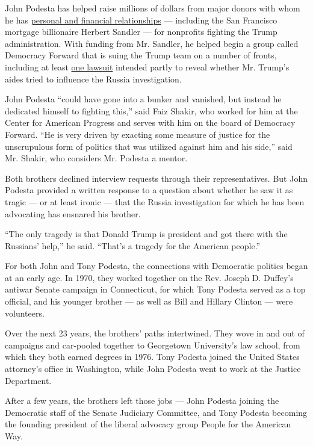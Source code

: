 John Podesta has helped raise millions of dollars from major donors with
whom he has
\href{https://www.politico.com/story/2016/11/john-podesta-donor-foundation-230571}{personal
and financial relationships} --- including the San Francisco mortgage
billionaire Herbert Sandler --- for nonprofits fighting the Trump
administration. With funding from Mr. Sandler, he helped begin a group
called Democracy Forward that is suing the Trump team on a number of
fronts, including at least
\href{https://democracyforward.org/wp-content/uploads/2017/09/DOJ-FOIA-Complaint.pdf}{one
lawsuit} intended partly to reveal whether Mr. Trump's aides tried to
influence the Russia investigation.

John Podesta ``could have gone into a bunker and vanished, but instead
he dedicated himself to fighting this,'' said Faiz Shakir, who worked
for him at the Center for American Progress and serves with him on the
board of Democracy Forward. ``He is very driven by exacting some measure
of justice for the unscrupulous form of politics that was utilized
against him and his side,'' said Mr. Shakir, who considers Mr. Podesta a
mentor.

Both brothers declined interview requests through their representatives.
But John Podesta provided a written response to a question about whether
he saw it as tragic --- or at least ironic --- that the Russia
investigation for which he has been advocating has ensnared his brother.

``The only tragedy is that Donald Trump is president and got there with
the Russians' help,'' he said. ``That's a tragedy for the American
people.''

For both John and Tony Podesta, the connections with Democratic politics
began at an early age. In 1970, they worked together on the Rev. Joseph
D. Duffey's antiwar Senate campaign in Connecticut, for which Tony
Podesta served as a top official, and his younger brother --- as well as
Bill and Hillary Clinton --- were volunteers.

Over the next 23 years, the brothers' paths intertwined. They wove in
and out of campaigns and car-pooled together to Georgetown University's
law school, from which they both earned degrees in 1976. Tony Podesta
joined the United States attorney's office in Washington, while John
Podesta went to work at the Justice Department.

After a few years, the brothers left those jobs --- John Podesta joining
the Democratic staff of the Senate Judiciary Committee, and Tony Podesta
becoming the founding president of the liberal advocacy group People for
the American Way.

